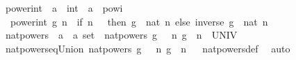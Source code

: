 \begin{isabellebody}
%
\isadelimproof
\isanewline
%
\endisadelimproof
\isanewline
{}\isamarkupfalse%
\ power{\isacharunderscore}{\kern0pt}int\ {\isacharcolon}{\kern0pt}{\isacharcolon}{\kern0pt}\ {\isachardoublequoteopen}{\isacharprime}{\kern0pt}a\ {\isasymRightarrow}\ int\ {\isasymRightarrow}\ {\isacharprime}{\kern0pt}a{\isachardoublequoteclose}\ {\isacharparenleft}{\kern0pt}\ {\isachardoublequoteopen}powi{\isachardoublequoteclose}\ {}{}{\isacharparenright}{\kern0pt}\ \isanewline
\ \ {\isachardoublequoteopen}power{\isacharunderscore}{\kern0pt}int\ g\ n\ {\isacharequal}{\kern0pt}\ {\isacharparenleft}{\kern0pt}if\ n\ {\isasymge}\ {}\ then\ g\ {\isacharcircum}{\kern0pt}\ {\isacharparenleft}{\kern0pt}nat\ n{\isacharparenright}{\kern0pt}\ else\ {\isacharparenleft}{\kern0pt}inverse\ g{\isacharparenright}{\kern0pt}\ {\isacharcircum}{\kern0pt}\ {\isacharparenleft}{\kern0pt}nat\ {\isacharparenleft}{\kern0pt}{\isacharminus}{\kern0pt}n{\isacharparenright}{\kern0pt}{\isacharparenright}{\kern0pt}{\isacharparenright}{\kern0pt}{\isachardoublequoteclose}\isanewline
\isanewline
{}\isamarkupfalse%
\ nat{\isacharunderscore}{\kern0pt}powers\ {\isacharcolon}{\kern0pt}{\isacharcolon}{\kern0pt}\ {\isachardoublequoteopen}{\isacharprime}{\kern0pt}a\ {\isasymRightarrow}\ {\isacharprime}{\kern0pt}a\ set{\isachardoublequoteclose}\ \ {\isachardoublequoteopen}nat{\isacharunderscore}{\kern0pt}powers\ g\ {\isacharequal}{\kern0pt}\ {\isacharparenleft}{\kern0pt}{\isacharparenleft}{\kern0pt}{\isasymlambda}\ n{\isachardot}{\kern0pt}\ g\ {\isacharcircum}{\kern0pt}\ n{\isacharparenright}{\kern0pt}\ {\isacharbackquote}{\kern0pt}\ UNIV{\isacharparenright}{\kern0pt}{\isachardoublequoteclose}\isanewline
\isanewline
{}\isamarkupfalse%
\ nat{\isacharunderscore}{\kern0pt}powers{\isacharunderscore}{\kern0pt}eq{\isacharunderscore}{\kern0pt}Union{\isacharcolon}{\kern0pt}\ {\isachardoublequoteopen}nat{\isacharunderscore}{\kern0pt}powers\ g\ {\isacharequal}{\kern0pt}\ {\isacharparenleft}{\kern0pt}{\isasymUnion}\ n{\isachardot}{\kern0pt}\ {\isacharbraceleft}{\kern0pt}g\ {\isacharcircum}{\kern0pt}\ n{\isacharbraceright}{\kern0pt}{\isacharparenright}{\kern0pt}{\isachardoublequoteclose}%
\isadelimproof
\ %
\endisadelimproof
%
\isatagproof
{}\isamarkupfalse%
\ nat{\isacharunderscore}{\kern0pt}powers{\isacharunderscore}{\kern0pt}def\ \isamarkupfalse%
\ auto%
\endisatagproof
{\isafoldproof}%
%
\isadelimproof
%
\endisadelimproof
\isanewline
\isanewline
{}\isamarkupfalse%

\end{isabellebody}
